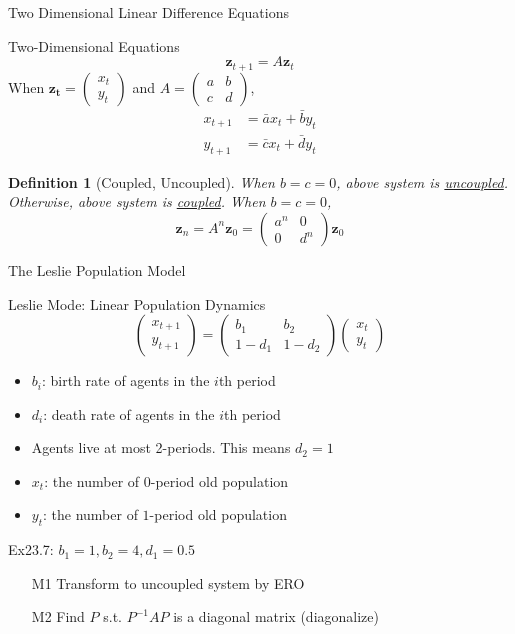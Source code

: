\documentclass[a4paper,11pt]{article}
\newtheorem{defn}{Definition}
\newcommand{\bd}{\mathbf}
\begin{document}
\begin{frame}[t]{Two Dimensional Linear Difference Equations}
	\begin{block}
		{Two-Dimensional Equations}
		\[
			\bd{z}_{t+1} = A\bd{z}_{t}
		\]When $\bd{z_t}=\begin{pmatrix}
			x_t\\y_t
		\end{pmatrix}$ and $A=\begin{pmatrix}
			a&b\\c&d
		\end{pmatrix}$,
		\begin{align*}
			x_{t+1} &= \bar{a}x_t + \bar{b}y_t\\
			y_{t+1} &= \bar{c}x_t + \bar{d}y_t
		\end{align*}
	\end{block}
	\begin{defn}
		[Coupled, Uncoupled] When $b=c=0$, above system is \uline{uncoupled}. Otherwise, above system is \uline{coupled}. When $b=c=0$, \[
			\bd{z}_n = A^n \bd{z}_0 = \begin{pmatrix}
				a^n & 0 \\ 
				0 & d^n
			\end{pmatrix} \bd{z}_0 
		\]
	\end{defn}
\end{frame}

\begin{frame}[t]{The Leslie Population Model}
	\begin{block}
		{Leslie Mode: Linear Population Dynamics} 
		\[
			\begin{pmatrix}
				x_{t+1}\\
				y_{t+1}
			\end{pmatrix} = \begin{pmatrix}
				b_1 & b_2\\
				1-d_1 & 1-d_2
			\end{pmatrix}\begin{pmatrix}
				x_t\\
				y_t
			\end{pmatrix}
		\]
		\begin{itemize}
			\item $b_i$: birth rate of agents in the $i$th period
			\item $d_i$: death rate of agents in the $i$th period
			\item Agents live at most 2-periods. This means $d_2=1$
			\item $x_t$: the number of $0$-period old population
			\item $y_t$: the number of $1$-period old population
		\end{itemize}
	\end{block}
	Ex23.7: $b_1=1, b_2=4, d_1=0.5$
	\begin{itemize}
		\item [M1] Transform to uncoupled system by ERO
		\item [M2] Find $P$ s.t. $P^{-1}AP$ is a diagonal matrix (diagonalize)
	\end{itemize}
\end{frame}
\end{document}
